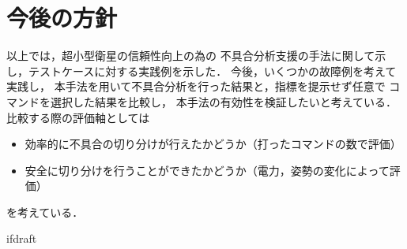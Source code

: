 \documentclass[11pt]{report}
\begin{document}
\fi


\section{今後の方針}
以上では，超小型衛星の信頼性向上の為の
不具合分析支援の手法に関して示し，テストケースに対する実践例を示した．
今後，いくつかの故障例を考えて実践し，
本手法を用いて不具合分析を行った結果と，指標を提示せず任意で
コマンドを選択した結果を比較し，
本手法の有効性を検証したいと考えている．
比較する際の評価軸としては
\begin{itemize}
   \item 効率的に不具合の切り分けが行えたかどうか（打ったコマンドの数で評価）
   \item 安全に切り分けを行うことができたかどうか（電力，姿勢の変化によって評価）
\end{itemize}
を考えている．

\begin{comment}
\section{まとめ}

モデル化に関して
実際の衛星ではコンポーネント数やコマンド・テレメトリの数
が膨大であるためモデルが複雑化し，人によるモデル生成では
ヒューマンエラーや，作業量を考えると非現実的である．
そのため，将来的にはこれらを必要最低限の情報から生成する手法に関しても
検討していく．

また，故障診断のコンテキストによってどこまで掘り下げるべきか使い分けるべきである
\cite{Ontology1998}ことを書く．

一方で，人工衛星は内部のコンポーネントが非常に密集しているおり，人間が設計時に考慮した
意図したつながりだけでなく，意図しないつながりも多く存在する．
このような意図しないつながりによって，波及効果が発生することが衛星内部の理解が
困難になり
\end{comment}

\expandafter\ifx\csname ifdraft\endcsname\relax
  
\end{document}
